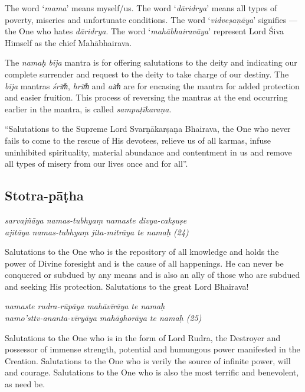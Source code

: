 \documentclass[12pt,oneside,a4paper]{article}
\newenvironment{shloka}[1]
  {\bigskip\center#1\varwidth{\linewidth}}
  {\endvarwidth\endcenter\bigskip}
\newcommand{\tl}[1]{\emph{#1}}
\begin{document}
The word ‘\tl{mama}’ means myself/us. The word ‘\tl{dāridrya}’ means all types
of poverty, miseries and unfortunate conditions. The word ‘\tl{vidveṣaṇāya}’
signifies — the One who hates \tl{dāridrya}. The word ‘\tl{mahābhairavāya}’
represent Lord Śiva Himself as the chief Mahābhairava.

The \tl{namaḥ bīja} mantra is for offering salutations to the deity and
indicating our complete surrender and request to the deity to take charge of
our destiny. The \tl{bīja} mantras \tl{śrīm̐}, \tl{hrīm̐} and \tl{aim̐} are for
encasing the mantra for added protection and easier fruition. This process of
reversing the mantras at the end occurring earlier in the mantra, is called
\tl{sampuṭīkaraṇa}.

``Salutations to the Supreme Lord Svarṇākarṣaṇa Bhairava, the One who never
fails to come to the rescue of His devotees, relieve us of all karmas, infuse
uninhibited spirituality, material abundance and contentment in us and remove
all types of misery from our lives once and for all''.

\subsection{Stotra-pāṭha}

\begin{shloka}\itshape
  sarvajñāya namas-tubhyaṃ namaste divya-cakṣuṣe\\
  ajitāya namas-tubhyaṃ jita-mitrāya te namaḥ (24)
\end{shloka}

Salutations to the One who is the repository of all knowledge and holds
the power of Divine foresight and is the cause of all happenings. He can never
be conquered or subdued by any means and is also an ally of those who are
subdued and seeking His protection. Salutations to the great Lord Bhairava!

\begin{shloka}\itshape
  namaste rudra-rūpāya mahāvīrāya te namaḥ\\
  namo'sttv-ananta-vīryāya mahāghorāya te namaḥ (25)
\end{shloka}

Salutations to the One who is in the form of Lord Rudra, the Destroyer and
possessor of immense strength, potential and humungous power manifested in
the Creation. Salutations to the One who is verily the source of infinite power,
will and courage. Salutations to the One who is also the most terrific and
benevolent, as need be.
\end{document}
